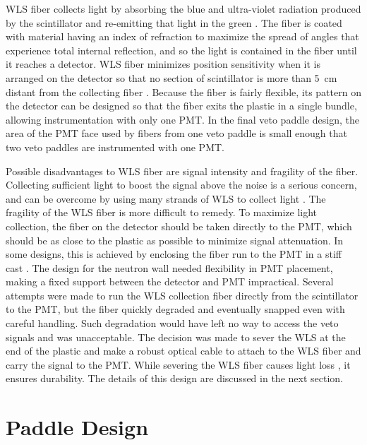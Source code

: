 WLS fiber collects light by absorbing the blue and ultra-violet radiation produced by the scintillator and re-emitting that light in the green \citep{Knoll}.  The fiber is coated with material having an index of refraction to maximize the spread of angles that experience total internal reflection, and so the light is contained in the fiber until it reaches a detector.  WLS fiber minimizes position sensitivity when it is arranged on the detector so that no section of scintillator is more than 5~cm distant from the collecting fiber \citep{Aguillion_scintTiles}.  Because the fiber is fairly flexible, its pattern on the detector can be designed so that the fiber exits the plastic in a single bundle, allowing instrumentation with only one PMT.  In the final veto paddle design, the area of the PMT face used by fibers from one veto paddle is small enough that two veto paddles are instrumented with one PMT.

Possible disadvantages to WLS fiber are signal intensity and fragility of the fiber.  Collecting sufficient light to boost the signal above the noise is a serious concern, and can be overcome by using many strands of WLS to collect light \citep{deBarbaro}.  The fragility of the WLS fiber is more difficult to remedy.  To maximize light collection, the fiber on the detector should be taken directly to the PMT, which should be as close to the plastic as possible to minimize signal attenuation.  In some designs, this is achieved by enclosing the fiber run to the PMT in a stiff cast \citep{GLAST}.  The design for the neutron wall needed flexibility in PMT placement, making a fixed support between the detector and PMT impractical.  Several attempts were made to run the WLS collection fiber directly from the scintillator to the PMT, but the fiber quickly degraded and eventually snapped even with careful handling.  Such degradation would have left no way to access the veto signals and was unacceptable.  The decision was made to sever the WLS at the end of the plastic and make a robust optical cable to attach to the WLS fiber and carry the signal to the PMT.  While severing the WLS fiber causes light loss \citep{ayotte_surfacePrep}, it ensures durability.  The details of this design are discussed in the next section.  

\section{Paddle Design}

